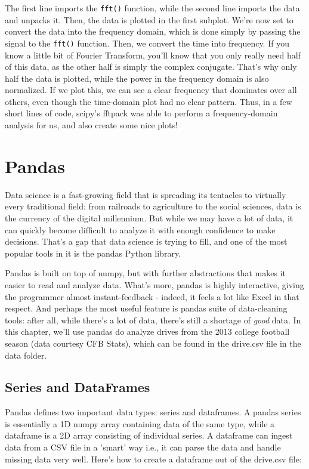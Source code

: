 \documentclass[12pt]{article}
\newcommand{\code}{\texttt}
\begin{document}
The first line imports the \code{fft()} function, while the second line imports the data and unpacks it. Then, the data is plotted in the first subplot. We're now set to convert the data into the frequency domain, which is done simply by passing the signal to the \code{fft()} function. Then, we convert the time into frequency. If you know a little bit of Fourier Transform, you'll know that you only really need half of this data, as the other half is simply the complex conjugate. That's why only half the data is plotted, while the power in the frequency domain is also normalized. If we plot this, we can see a clear frequency that dominates over all others, even though the time-domain plot had no clear pattern. Thus, in a few short lines of code, scipy's fftpack was able to perform a frequency-domain analysis for us, and also create some nice plots!

\newpage
\section{Pandas}
Data science is a fast-growing field that is spreading its tentacles to virtually every traditional field: from railroads to agriculture to the social sciences, data is the currency of the digital millennium. But while we may have a lot of data, it can quickly become difficult to analyze it with enough confidence to make decisions. That's a gap that data science is trying to fill, and one of the most popular tools in it is the pandas Python library. 

Pandas is built on top of numpy, but with further abstractions that makes it easier to read and analyze data. What's more, pandas is highly interactive, giving the programmer almost instant-feedback - indeed, it feels a lot like Excel in that respect. And perhaps the most useful feature is pandas suite of data-cleaning tools: after all, while there's a lot of data, there's still a shortage of \textit{good} data. In this chapter, we'll use pandas do analyze drives from the 2013 college football season (data courtesy CFB Stats), which can be found in the drive.csv file in the data folder.

\subsection{Series and DataFrames}
Pandas defines two important data types: series and dataframes. A pandas series is essentially a 1D numpy array containing data of the same type, while a dataframe is a 2D array consisting of individual series. A dataframe can ingest data from a CSV file in a 'smart' way i.e., it can parse the data and handle missing data very well. Here's how to create a dataframe out of the drive.csv file:
\end{document}
